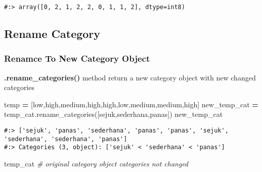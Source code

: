 \documentclass[
]{book}
\newenvironment{Shaded}{\begin{snugshade}}{\end{snugshade}}
\newcommand{\CommentTok}[1]{\textcolor[rgb]{0.37,0.37,0.37}{\textit{#1}}}
\newcommand{\NormalTok}[1]{#1}
\newcommand{\OperatorTok}[1]{\textcolor[rgb]{0.43,0.43,0.43}{\textbf{#1}}}
\newcommand{\StringTok}[1]{\textcolor[rgb]{0.5,0.5,0.5}{#1}}
\begin{document}
\begin{verbatim}
#:> array([0, 2, 1, 2, 2, 0, 1, 1, 2], dtype=int8)
\end{verbatim}

\hypertarget{rename-category}{%
\subsection{Rename Category}\label{rename-category}}

\hypertarget{renamce-to-new-category-object}{%
\subsubsection{Renamce To New Category Object}\label{renamce-to-new-category-object}}

\textbf{.rename\_categories()} method return a new category object with new changed categories

\begin{Shaded}
\begin{Highlighting}[]
\NormalTok{temp }\OperatorTok{=}\NormalTok{ [}\StringTok{\textquotesingle{}low\textquotesingle{}}\NormalTok{,}\StringTok{\textquotesingle{}high\textquotesingle{}}\NormalTok{,}\StringTok{\textquotesingle{}medium\textquotesingle{}}\NormalTok{,}\StringTok{\textquotesingle{}high\textquotesingle{}}\NormalTok{,}\StringTok{\textquotesingle{}high\textquotesingle{}}\NormalTok{,}\StringTok{\textquotesingle{}low\textquotesingle{}}\NormalTok{,}\StringTok{\textquotesingle{}medium\textquotesingle{}}\NormalTok{,}\StringTok{\textquotesingle{}medium\textquotesingle{}}\NormalTok{,}\StringTok{\textquotesingle{}high\textquotesingle{}}\NormalTok{]}
\NormalTok{new\_temp\_cat }\OperatorTok{=}\NormalTok{ temp\_cat.rename\_categories([}\StringTok{\textquotesingle{}sejuk\textquotesingle{}}\NormalTok{,}\StringTok{\textquotesingle{}sederhana\textquotesingle{}}\NormalTok{,}\StringTok{\textquotesingle{}panas\textquotesingle{}}\NormalTok{])}
\NormalTok{new\_temp\_cat }
\end{Highlighting}
\end{Shaded}

\begin{verbatim}
#:> ['sejuk', 'panas', 'sederhana', 'panas', 'panas', 'sejuk', 'sederhana', 'sederhana', 'panas']
#:> Categories (3, object): ['sejuk' < 'sederhana' < 'panas']
\end{verbatim}

\begin{Shaded}
\begin{Highlighting}[]
\NormalTok{temp\_cat   }\CommentTok{\# original category object categories not changed}
\end{Highlighting}
\end{Shaded}
\end{document}
